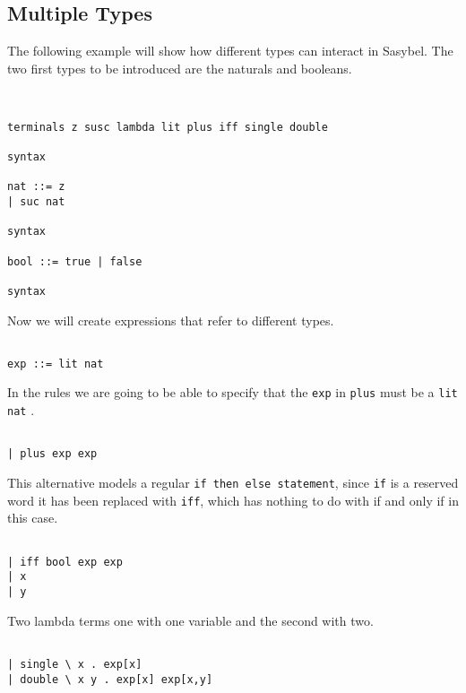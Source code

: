 \documentclass[12pt]{article}
\begin{document}
\subsection{Multiple Types}
The following example will show how different types can interact in \textmd{Sasybel}. The two first types to be introduced are the naturals and booleans.
\begin{verbatim}


terminals z susc lambda lit plus iff single double

syntax

nat ::= z
| suc nat

syntax

bool ::= true | false

syntax

\end{verbatim}
Now we will create expressions that refer to different types.
\begin{verbatim}

exp ::= lit nat

\end{verbatim}
In the rules we are going to be able to specify that the {\tt exp} in {\tt plus} must be a {\tt lit nat} .
\begin{verbatim}

| plus exp exp

\end{verbatim}
This alternative models a regular {\tt if  then  else statement}, since {\tt if} is a reserved word it has been replaced with {\tt iff}, which has nothing to do with if and only if in this case.
\begin{verbatim}

| iff bool exp exp
| x
| y

\end{verbatim}
Two lambda terms one with one variable and the second with two.
\begin{verbatim}

| single \ x . exp[x]
| double \ x y . exp[x] exp[x,y]

\end{verbatim}
\end{document}
